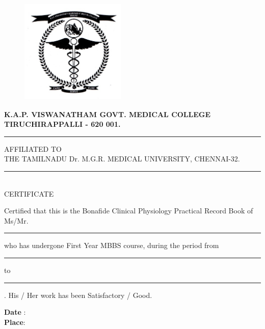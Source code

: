 \documentclass[a4paper,12pt]{book}
\begin{document}
\newpage
\vspace*{\fill}
\begin{center}
\begin{figure}[H]
	\centering
	\includegraphics[height=5cm,width=5cm]{./collegeEmblem/collegeEmblem.jpg}
\end{figure}
	\textbf{\Huge {K.A.P. VISWANATHAM GOVT. MEDICAL COLLEGE}}\\
	\textbf{\Large{TIRUCHIRAPPALLI - 620 001.}}\\

	\rule{4in}{0.5pt}
	\parbox{3.9in}{\centering AFFILIATED TO\\ THE TAMILNADU Dr. M.G.R. MEDICAL UNIVERSITY, CHENNAI-32.}
	\rule{4in}{0.5pt}\\
	{\centering \LARGE{CERTIFICATE\\}}
\end{center}
	\par
	Certified that this is the Bonafide Clinical Physiology Practical Record Book of Ms/Mr. \rule{3.5in}{.5pt}who has undergone First Year MBBS course, during the period from \rule{1in}{.5pt} to \rule{1in}{.5pt}.  His / Her work has been Satisfactory / Good.\\


\begin{table}[H]
 \renewcommand{\arraystretch}{.6} \centering
 \end{table}

\noindent \textbf{Date} :\\
\textbf{Place}:\\
\vspace*{\fill}
\end{document}
